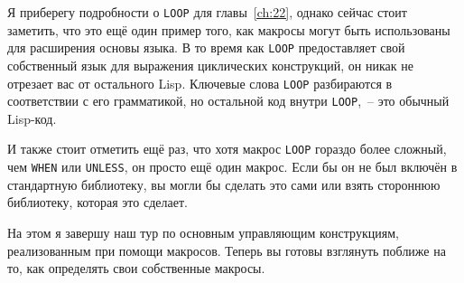 Я приберегу подробности о \lstinline{LOOP} для главы~\ref{ch:22}, однако сейчас стоит заметить,
что это ещё один пример того, как макросы могут быть использованы для расширения основы
языка. В то время как \lstinline{LOOP} предоставляет свой собственный язык для выражения
циклических конструкций, он никак не отрезает вас от остального Lisp. Ключевые слова
\lstinline{LOOP} разбираются в соответствии с его грамматикой, но остальной код внутри
\lstinline{LOOP},~-- это обычный Lisp-код.

И также стоит отметить ещё раз, что хотя макрос \lstinline{LOOP} гораздо более сложный, чем
\lstinline{WHEN} или \lstinline{UNLESS}, он просто ещё один макрос. Если бы он не был включён в
стандартную библиотеку, вы могли бы сделать это сами или взять стороннюю библиотеку,
которая это сделает.

На этом я завершу наш тур по основным управляющим конструкциям, реализованным при помощи
макросов. Теперь вы готовы взглянуть поближе на то, как определять свои собственные
макросы.

